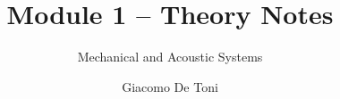 \documentclass{GDTReportClass}
\title{Module 1 -- Theory Notes}  %
\subtitle{Mechanical and Acoustic Systems}
\author{Giacomo De Toni}  %
\begin{document}
    \settingfrontmatter  %

    \settingmaincontent  

    
    
    
    
    
    
    
\end{document}
